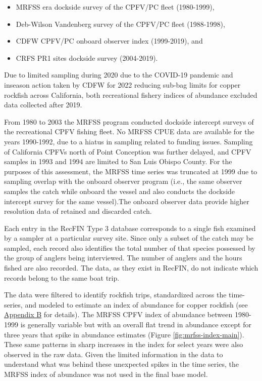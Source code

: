 \documentclass[11pt,
  english,
  letterpaper,
]{article}
\providecommand{\tightlist}{%
  \setlength{\itemsep}{0pt}\setlength{\parskip}{0pt}}
\providecommand{\tightlist}{%
  \setlength{\itemsep}{0pt}\setlength{\parskip}{0pt}}
\begin{document}
\begin{itemize}
\tightlist
\item
  MRFSS era dockside survey of the CPFV/PC fleet (1980-1999),
\item
  Deb-Wilson Vandenberg survey of the CPFV/PC fleet (1988-1998),
\item
  CDFW CPFV/PC onboard observer index (1999-2019), and
\item
  CRFS PR1 sites dockside survey (2004-2019).
\end{itemize}

Due to limited sampling during 2020 due to the COVID-19 pandemic and inseason action taken by CDFW for 2022 reducing sub-bag limits for copper rockfish across California, both recreational fishery indices of abundance excluded data collected after 2019.

From 1980 to 2003 the MRFSS program conducted dockside intercept surveys of the recreational CPFV fishing fleet. No MRFSS CPUE data are available for the years 1990-1992, due to a hiatus in sampling related to funding issues. Sampling of California CPFVs north of Point Conception was further delayed, and CPFV samples in 1993 and 1994 are limited to San Luis Obispo County. For the purposes of this assessment, the MRFSS time series was truncated at 1999 due to sampling overlap with the onboard observer program (i.e., the same observer samples the catch while onboard the vessel and also conducts the dockside intercept survey for the same vessel).The onboard observer data provide higher resolution data of retained and discarded catch.

Each entry in the RecFIN Type 3 database corresponds to a single fish examined by a sampler at a particular survey site. Since only a subset of the catch may be sampled, each record also identifies the total number of that species possessed by the group of anglers being interviewed. The number of anglers and the hours fished are also recorded. The data, as they exist in RecFIN, do not indicate which records belong to the same boat trip.

The data were filtered to identify rockfish trips, standardized across the time-series, and modeled to estimate an index of abundance for copper rockfish (see \protect\hyperlink{mrfss-cpfv-index}{Appendix B} for details). The MRFSS CPFV index of abundance between 1980-1999 is generally variable but with an overall flat trend in abundance except for three years that spike in abundance estimates (Figure \ref{fig:mrfss-index-main}). These same patterns in sharp increases in the index for select years were also observed in the raw data. Given the limited information in the data to understand what was behind these unexpected spikes in the time series, the MRFSS index of abundance was not used in the final base model.
\end{document}
